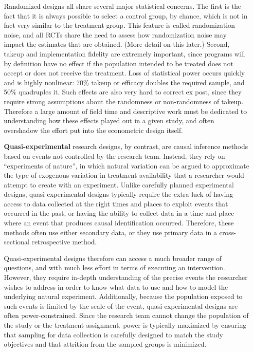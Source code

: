 Randomized designs all share several major statistical concerns.
The first is the fact that it is always possible to select a control group,
by chance, which is not in fact very similar to the treatment group.
This feature is called randomization noise, and all RCTs share the need to assess
how randomization noise may impact the estimates that are obtained.
(More detail on this later.)
Second, takeup and implementation fidelity are extremely important,
since programs will by definition have no effect
if the population intended to be treated
does not accept or does not receive the treatment.
Loss of statistical power occurs quickly and is highly nonlinear:
70\% takeup or efficacy doubles the required sample, and 50\% quadruples it.
Such effects are also very hard to correct ex post,
since they require strong assumptions about the randomness or non-randomness of takeup.
Therefore a large amount of field time and descriptive work
must be dedicated to understanding how these effects played out in a given study,
and often overshadow the effort put into the econometric design itself.

\textbf{Quasi-experimental} research designs,
by contrast, are causal inference methods based on events not controlled by the research team.
Instead, they rely on ``experiments of nature'',
in which natural variation can be argued to approximate
the type of exogenous variation in treatment availability
that a researcher would attempt to create with an experiment.\cite{dinardo2016natural}
Unlike carefully planned experimental designs,
quasi-experimental designs typically require the extra luck
of having access to data collected at the right times and places
to exploit events that occurred in the past,
or having the ability to collect data in a time and place
where an event that produces causal identification occurred.
Therefore, these methods often use either secondary data,
or they use primary data in a cross-sectional retrospective method.

Quasi-experimental designs therefore can access a much broader range of questions,
and with much less effort in terms of executing an intervention.
However, they require in-depth understanding of the precise events
the researcher wishes to address in order to know what data to use
and how to model the underlying natural experiment.
Additionally, because the population exposed
to such events is limited by the scale of the event,
quasi-experimental designs are often power-constrained.
Since the research team cannot change the population of the study
or the treatment assignment, power is typically maximized by ensuring
that sampling for data collection is carefully designed to match the study objectives
and that attrition from the sampled groups is minimized.


